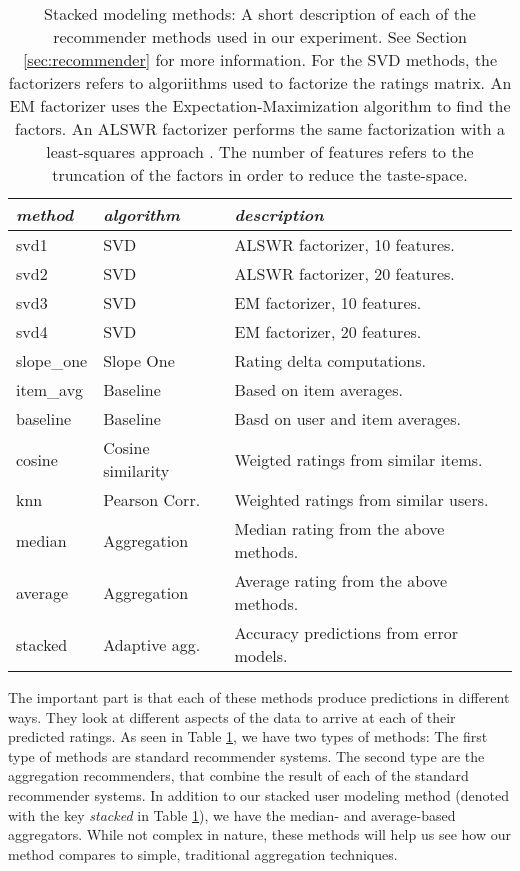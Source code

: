 \begin{table}[t]
  \begin{tabular*}{\textwidth}{ l l l }
    \toprule
    \emph{method} &  \emph{algorithm} & \emph{description} \\
    \midrule
    svd1          & SVD                   & ALSWR factorizer, 10 features. \\
    svd2          & SVD                   & ALSWR factorizer, 20 features. \\
    svd3          & SVD                   & EM factorizer, 10 features. \\
    svd4          & SVD                   & EM factorizer, 20 features. \\
    slope\_one    & Slope One             & Rating delta computations. \\
    item\_avg     & Baseline              & Based on item averages. \\ 
    baseline      & Baseline              & Basd on user and item averages.\\ 
    cosine   	    & Cosine similarity     & Weigted ratings from similar items.\\ 
    knn       	  & Pearson Corr.         & Weighted ratings from similar users.\\
    \midrule
    median    	  & Aggregation           & Median rating from the above methods. \\
    average    	  & Aggregation           & Average rating from the above methods. \\
    stacked       & Adaptive agg.         & Accuracy predictions from error models. \\
    \bottomrule
  \end{tabular*}
  \caption[Stacked Modeling Methods]{
    Stacked modeling methods: A short description of each of the recommender methods
    used in our experiment. See Section \ref{sec:recommender} for more information.
    For the SVD methods, the factorizers refers to algoriithms used to factorize the ratings matrix.
    An EM factorizer uses the Expectation-Maximization algorithm to find the factors.
    An ALSWR factorizer performs the same factorization with a least-squares approach \citep{Zhou2008}.
    The number of features refers to the truncation of the factors in order to reduce the taste-space.
  }
  \label{table:results:methods}
\end{table}

The important part is that each of these methods produce predictions in different ways.
They look at different aspects of the data to arrive at each of their predicted ratings.
As seen in Table \ref{table:results:methods}, we have two types of methods:
The first type of methods are standard recommender systems.
The second type are the aggregation recommenders, that combine the result
of each of the standard recommender systems.
In addition to our stacked user modeling method
(denoted with the key \emph{stacked} in Table \ref{table:results:methods}),
we have the median- and average-based aggregators.
While not complex in nature, these methods
will help us see how our method compares to simple, traditional
aggregation techniques.

